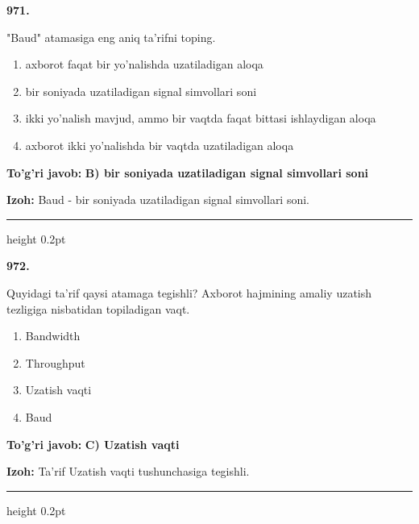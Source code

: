 \documentclass[10pt,a4paper,oneside]{article}
\begin{document}
\noindent\textbf{\color{ink}971.}
\par
"Baud" atamasiga eng aniq ta'rifni toping.
\begin{enumerate}[label=\Alph*),leftmargin=9mm]
\item axborot faqat bir yo'nalishda uzatiladigan aloqa
\item bir soniyada uzatiladigan signal simvollari soni
\item ikki yo'nalish mavjud, ammo bir vaqtda faqat bittasi ishlaydigan aloqa
\item axborot ikki yo'nalishda bir vaqtda uzatiladigan aloqa
\end{enumerate}
\begin{tcolorbox}[enhanced,breakable,colback=teal!4,colframe=teal!50!black,boxrule=0.5pt,arc=1.1mm,left=3mm,right=3mm,top=1.7mm,bottom=1.7mm,before skip=2mm,after skip=2mm]
\textbf{\color{teal}To'g'ri javob:} \textbf{B) bir soniyada uzatiladigan signal simvollari soni}
\par\smallskip
\textbf{Izoh:} Baud - bir soniyada uzatiladigan signal simvollari soni.
\end{tcolorbox}
\vspace{2mm}\hrule height 0.2pt \vspace{3mm}

\noindent\textbf{\color{ink}972.}
\par
Quyidagi ta'rif qaysi atamaga tegishli? Axborot hajmining amaliy uzatish tezligiga nisbatidan topiladigan vaqt.
\begin{enumerate}[label=\Alph*),leftmargin=9mm]
\item Bandwidth
\item Throughput
\item Uzatish vaqti
\item Baud
\end{enumerate}
\begin{tcolorbox}[enhanced,breakable,colback=teal!4,colframe=teal!50!black,boxrule=0.5pt,arc=1.1mm,left=3mm,right=3mm,top=1.7mm,bottom=1.7mm,before skip=2mm,after skip=2mm]
\textbf{\color{teal}To'g'ri javob:} \textbf{C) Uzatish vaqti}
\par\smallskip
\textbf{Izoh:} Ta'rif Uzatish vaqti tushunchasiga tegishli.
\end{tcolorbox}
\vspace{2mm}\hrule height 0.2pt \vspace{3mm}
\end{document}
